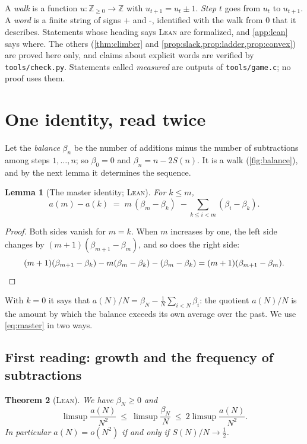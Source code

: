 \documentclass[11pt]{amsart}
\newtheorem{theorem}{Theorem}[section]
\newtheorem{lemma}[theorem]{Lemma}
\theoremstyle{definition}
\newcommand{\Z}{\mathbb{Z}}
\newcommand{\LEAN}{\textsc{Lean}}
\newcommand{\lean}[1]{\texttt{#1}}
\newcommand{\up}{\texttt{+}}
\newcommand{\dn}{\texttt{-}}
\begin{document}
A \emph{walk} is a function $u:\Z_{\ge0}\to\Z$ with $u_{t+1}=u_t\pm1$. \emph{Step $t$} goes from $u_t$ to $u_{t+1}$. A \emph{word} is a finite string of signs $\up$ and $\dn$,
identified with the walk from $0$ that it describes. Statements whose heading says \LEAN{} are formalized, and \cref{app:lean} says where. The others
(\cref{thm:climber} and \cref{prop:slack,prop:ladder,prop:convex}) are proved here only, and claims about explicit words are verified
by \lean{tools/check.py}. Statements called
\emph{measured} are outputs of \lean{tools/game.c}; no proof uses them.

\section{One identity, read twice}\label{sec:balance}

Let the \emph{balance} $\beta_n$ be the number of additions minus the number of subtractions among steps $1,\dots,n$; so $\beta_0=0$ and $\beta_n=n-2S(n)$. It is a
walk (\cref{fig:balance}), and by the next lemma it determines the sequence.

\begin{lemma}[The master identity; \LEAN]\label{lem:master}
For $k\le m$,
\begin{equation}\label{eq:master}
  a(m)-a(k)\;=\;m\,(\beta_m-\beta_k)\;-\sum_{k\le i<m}(\beta_i-\beta_k).
\end{equation}
\end{lemma}

\begin{proof}
Both sides vanish for $m=k$. When $m$ increases by one, the left side changes by ${(m+1)(\beta_{m+1}-\beta_m)}$, and so does the right side:
\[
 (m+1)(\beta_{m+1}-\beta_k)-m(\beta_m-\beta_k)-(\beta_m-\beta_k)=(m+1)(\beta_{m+1}-\beta_m). \qedhere
\]
\end{proof}

With $k=0$ it says that $a(N)/N=\beta_N-\frac1N\sum_{i<N}\beta_i$: the quotient $a(N)/N$ is the amount by which the
balance exceeds its own average over the past. We use \eqref{eq:master} in two ways.

\subsection{First reading: growth and the frequency of subtractions}

\begin{theorem}[\LEAN]\label{thm:frequency}
We have $\beta_N\ge0$ and
\[
  \limsup\frac{a(N)}{N^2}\ \le\ \limsup\frac{\beta_N}{N}\ \le\ 2\limsup\frac{a(N)}{N^2}.
\]
In particular $a(N)=o(N^2)$ if and only if $S(N)/N\to\frac12$.
\end{theorem}
\end{document}
